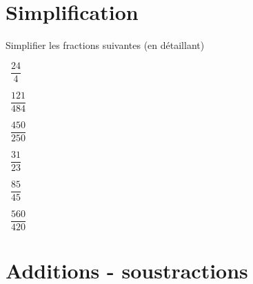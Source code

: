 
	\section{Simplification}
	
	Simplifier les fractions suivantes (en détaillant)
	\begin{questions}
	
		\question[2]  $\dfrac{24}{4}$
		\fillwithdottedlines{1.5cm}
		\begin{solution}
			
		\end{solution}
	
		\question[2]  $\dfrac{121}{484}$
		\fillwithdottedlines{1.5cm}
		\begin{solution}
			
		\end{solution}
	
	
		
	
		\question[2]  $\dfrac{450}{250}$
		\fillwithdottedlines{1.5cm}
		\begin{solution}
			
		\end{solution}
	
	
		\question[2]  $\dfrac{31}{23}$
		\fillwithdottedlines{1.5cm}
		\begin{solution}
			
		\end{solution}
	
	
		\question[2]  $\dfrac{85}{45}$
		\fillwithdottedlines{1.5cm}
		\begin{solution}
			
		\end{solution}
	
	
	
	
		\question[2]  $\dfrac{560}{420}$
		\fillwithdottedlines{1.5cm}
		\begin{solution}
			
		\end{solution}
	\end{questions}
	
\section{Additions - soustractions}

